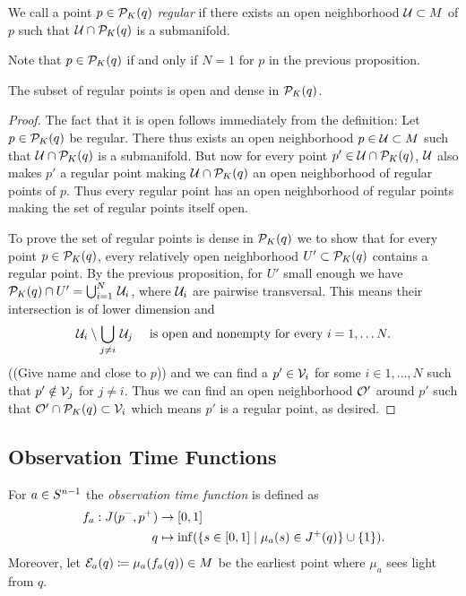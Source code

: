 \begin{definition}
We call a point $p\in \mathcal{P}_K(q)$ \emph{regular} if there exists an open neighborhood $\mathcal{U}\subset M$ of $p$ such that $\mathcal{U}\cap \mathcal{P}_K(q)$ is a submanifold.
\end{definition}
Note that $p\in \mathcal{P}_K(q)$ if and only if $N=1$ for $p$ in the previous proposition.


\begin{corollary}The subset of regular points is open and dense in $\mathcal{P}_K(q)$.
\end{corollary}
\begin{proof}
The fact that it is open follows immediately from the definition: Let $p\in \mathcal{P}_K(q)$ be regular. There thus exists an open neighborhood $p\in \mathcal{U}\subset M$ such that $\mathcal{U} \cap \mathcal{P}_K(q)$ is a submanifold. But now for every point $p'\in \mathcal{U}\cap\mathcal{P}_K(q)$, $\mathcal{U}$ also makes $p'$ a regular point making $\mathcal{U}\cap\mathcal{P}_K(q)$ an open neighborhood of regular points of $p$. Thus every regular point has an open neighborhood of regular points making the set of regular points itself open.

To prove the set of regular points is dense in ${\mathcal{P}_K(q)}$ we to show that for every point $p\in \mathcal{P}_K(q)$, every relatively open neighborhood $U'\subset\mathcal{P}_K(q)$ contains a regular point. By the previous proposition, for $U'$ small enough we have $\mathcal{P}_K(q)\cap U' = \bigcup_{i=1}^N\,\mathcal{U}_i$, where $\mathcal{U}_i$ are pairwise transversal. This means their intersection is of lower dimension and 
\[
    \mathcal{U}_i \setminus \bigcup_{j\neq i}\, \mathcal{U}_j \quad \text{ is open and nonempty for every }i=1,\dots N.
\]
((Give name and close to $p$))
and we can find a $p'\in \mathcal{V}_i$ for some $i\in 1,\dots,N$ such that $p'\notin \mathcal{V}_j$ for $j\neq i$. Thus we can find an open neighborhood $\mathcal{O}'$ around $p'$ such that $\mathcal{O}'\cap \mathcal{P}_K(q)\subset \mathcal{V}_i$ which means $p'$ is a regular point, as desired.
\end{proof}

\subsection{Observation Time Functions}
\begin{definition}\label{def:observationtime}
For $a\in S^{n-1}$ the \emph{observation time function} 
is defined as 
\begin{align*}
    f_a:J(p^-,p^+)&\to [0,1]\\
    q&\mapsto\inf(\{s\in [0,1] \mid \mu_a(s)\in J^+(q)\}\cup \{1\}).
\end{align*}
Moreover, let $\mathcal{E}_a(q)\coloneqq\mu_a(f_a(q))\in M$ be the earliest point where $\mu_a$ sees light from $q$.
\end{definition}

